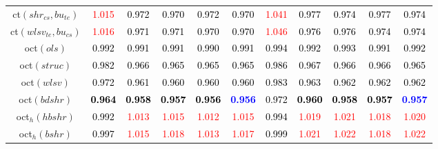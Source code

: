 \begin{tabular}[t]{c|>{}cccc>{}c|ccccc}
ct$(shr_{cs}, bu_{te})$ & \textcolor{red}{1.015} & \textcolor{black}{0.972} & \textcolor{black}{0.970} & \textcolor{black}{0.972} & \textcolor{black}{0.970} & \textcolor{red}{1.041} & \textcolor{black}{0.977} & \textcolor{black}{0.974} & \textcolor{black}{0.977} & \textcolor{black}{0.974}\\
ct$(wlsv_{te}, bu_{cs})$ & \textcolor{red}{1.016} & \textcolor{black}{0.971} & \textcolor{black}{0.971} & \textcolor{black}{0.970} & \textcolor{black}{0.970} & \textcolor{red}{1.046} & \textcolor{black}{0.976} & \textcolor{black}{0.976} & \textcolor{black}{0.974} & \textcolor{black}{0.974}\\
oct$(ols)$ & \textcolor{black}{0.992} & \textcolor{black}{0.991} & \textcolor{black}{0.991} & \textcolor{black}{0.990} & \textcolor{black}{0.991} & \textcolor{black}{0.994} & \textcolor{black}{0.992} & \textcolor{black}{0.993} & \textcolor{black}{0.991} & \textcolor{black}{0.992}\\
oct$(struc)$ & \textcolor{black}{0.982} & \textcolor{black}{0.966} & \textcolor{black}{0.965} & \textcolor{black}{0.965} & \textcolor{black}{0.965} & \textcolor{black}{0.986} & \textcolor{black}{0.967} & \textcolor{black}{0.966} & \textcolor{black}{0.966} & \textcolor{black}{0.965}\\
oct$(wlsv)$ & \textcolor{black}{0.972} & \textcolor{black}{0.961} & \textcolor{black}{0.960} & \textcolor{black}{0.960} & \textcolor{black}{0.960} & \textcolor{black}{0.983} & \textcolor{black}{0.963} & \textcolor{black}{0.962} & \textcolor{black}{0.962} & \textcolor{black}{0.962}\\
oct$(bdshr)$ & \textcolor{black}{\textbf{0.964}} & \textcolor{black}{\textbf{0.958}} & \textcolor{black}{\textbf{0.957}} & \textcolor{black}{\textbf{0.956}} & \textcolor{blue}{\textbf{0.956}} & \textcolor{black}{0.972} & \textcolor{black}{\textbf{0.960}} & \textcolor{black}{\textbf{0.958}} & \textcolor{black}{\textbf{0.957}} & \textcolor{blue}{\textbf{0.957}}\\
oct$_h(hbshr)$ & \textcolor{black}{0.992} & \textcolor{red}{1.013} & \textcolor{red}{1.015} & \textcolor{red}{1.012} & \textcolor{red}{1.015} & \textcolor{black}{0.994} & \textcolor{red}{1.019} & \textcolor{red}{1.021} & \textcolor{red}{1.018} & \textcolor{red}{1.020}\\
oct$_h(bshr)$ & \textcolor{black}{0.997} & \textcolor{red}{1.015} & \textcolor{red}{1.018} & \textcolor{red}{1.013} & \textcolor{red}{1.017} & \textcolor{black}{0.999} & \textcolor{red}{1.021} & \textcolor{red}{1.022} & \textcolor{red}{1.018} & \textcolor{red}{1.022}\\

\end{tabular}
